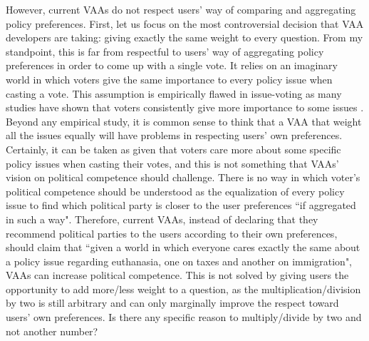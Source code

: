 \documentclass{scrartcl}
\begin{document}
However, current VAAs do not respect users' way of comparing and aggregating policy preferences. First, let us focus on the most controversial decision that VAA developers are taking: giving exactly the same weight to every question. From my standpoint, this is far from respectful to users' way of aggregating policy preferences in order to come up with a single vote. It relies on an imaginary world in which voters give the same importance to every policy issue when casting a vote. This assumption is empirically flawed in issue-voting as many studies have shown that voters consistently give more importance to some issues \cite{wlezien2005salience}. Beyond any empirical study, it is common sense to think that a VAA that weight all the issues equally will have problems in respecting users' own preferences. Certainly, it can be taken as given that voters care more about some specific policy issues when casting their votes, and this is not something that VAAs' vision on political competence should challenge. There is no way in which voter's political competence should be understood as the equalization of every policy issue to find which political party is closer to the user preferences ``if aggregated in such a way". Therefore, current VAAs, instead of declaring that they recommend political parties to the users according to their own preferences, should claim that ``given a world in which everyone cares exactly the same about a policy issue regarding euthanasia, one on taxes and another on immigration", VAAs can increase  political competence. This is not solved by giving users the opportunity to add more/less weight to a question, as the multiplication/division by two is still arbitrary and can only marginally improve the respect toward users' own preferences. Is there any specific reason to multiply/divide by two and not another number?
\\
\end{document}
